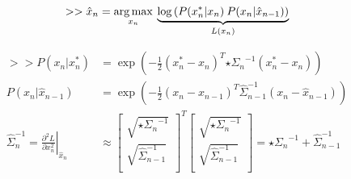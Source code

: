 \begin{algorithm}
\begin{equation*}
\begin{aligned}
>> \hat{x}_n &= \operatorname*{arg\,max}_{x_n} \: \underbrace{\log \left( P(x_n^*|x_n) \: P(x_n |\hat{x}_{n - 1}) \right)}_{L(x_n)}    
\\
\end{aligned}
\end{equation*}

\begin{equation*}
\begin{aligned}
>> P(x_n |x_n^*) &= \exp \left( -\tfrac{1}{2}(x_n^* - x_n )^T {\star{\Sigma}_n}^{-1}(x_n^* - x_n )\right)
\\
P(x_n |\hat{x}_{n - 1}) &= 
\exp \left( -\tfrac{1}{2} (x_n - \hat{x}_{n - 1} )^T \hat{\Sigma}_{n - 1}^{-1} (x_n - \hat{x}_{n - 1} )\right)
\\
\hat{\Sigma}_n^{-1} = 
\left.\tfrac{\partial^2 L}{\partial x_n^2}\right|_{\hat{x}_n} &\approx 
\left[
    \begin{array}{cc}
        \sqrt{{\star{\Sigma}_n}^{-1}} \\
        \sqrt{\hat{\Sigma}_{n - 1}^{-1}} \\
    \end{array}
\right]^T
\left[
    \begin{array}{c}
        \sqrt{{\star{\Sigma}_n}^{-1}} \\
        \sqrt{\hat{\Sigma}_{n - 1}^{-1}} \\
    \end{array}
\right]
= {\star{\Sigma}_n}^{-1} + \hat{\Sigma}_{n-1}^{-1}
\end{aligned}
\end{equation*}
\caption{
% 
% 
\emph{Split} inter-frame regression -- Kalman Filter (KF)
% 
% 
}
\label{tab:interframe}
\label{tab:kf-like}
\end{algorithm}